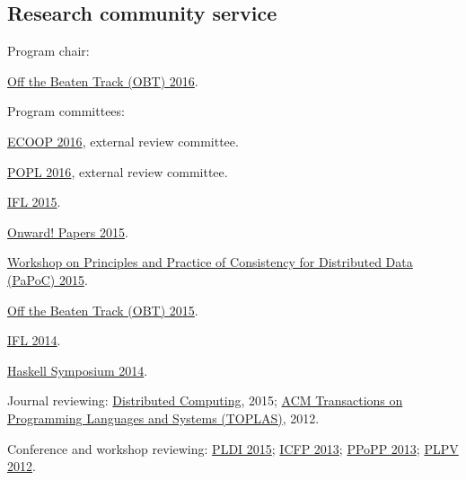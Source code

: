 \documentclass[10pt,letterpaper]{article}
\newenvironment{itemize*}
  {\begin{itemize}
      \setlength{\itemsep}{1pt}
      \setlength{\parskip}{3pt}
  }
  {\end{itemize}}
\begin{document}
\subsection*{Research community service}
\begin{itemize*}
\item Program chair:
  \begin{itemize*}
  \item
    \href{http://conf.researchr.org/track/POPL-2016/OBT-2016-talks}{Off
      the Beaten Track (OBT) 2016}.
  \end{itemize*}

\item Program committees:
  \begin{itemize*}
  \item
    \href{http://2016.ecoop.org/committee/ecoop-2016-papers-external-review-committee}{ECOOP
      2016}, external review committee.

  \item
    \href{http://conf.researchr.org/committee/POPL-2016/}{POPL 2016}, external review
    committee.

  \item \href{http://ifl2015.wikidot.com/}{IFL 2015}.

  \item
    \href{http://2015.splashcon.org/track/onward2015-papers}{Onward!
      Papers 2015}.

  \item \href{http://papoc.di.uminho.pt}{Workshop on Principles and
    Practice of Consistency for Distributed Data (PaPoC) 2015}.

  \item \href{http://www.cs.rice.edu/~sc40/obt15/}{Off the Beaten
    Track (OBT) 2015}.

  \item \href{http://ifl2014.github.io/}{IFL 2014}.

  \item \href{http://www.haskell.org/haskell-symposium/2014/}{Haskell
    Symposium 2014}.
  \end{itemize*}

\item Journal reviewing:
  \href{http://link.springer.com/journal/446}{Distributed Computing}, 2015;
  \href{http://compilers.cs.ucla.edu/toplas/}{ACM Transactions on
    Programming Languages and Systems (TOPLAS)}, 2012.

\item Conference and workshop reviewing:
  \href{http://conf.researchr.org/home/pldi2015/}{PLDI 2015};
  \href{http://icfpconference.org/icfp2013/}{ICFP 2013};
  \href{http://ppopp2013.ics.uci.edu/}{PPoPP 2013};
  \href{http://research.microsoft.com/en-us/um/people/nswamy/plpv12/}{PLPV
    2012}.
\end{itemize*}
\end{document}

